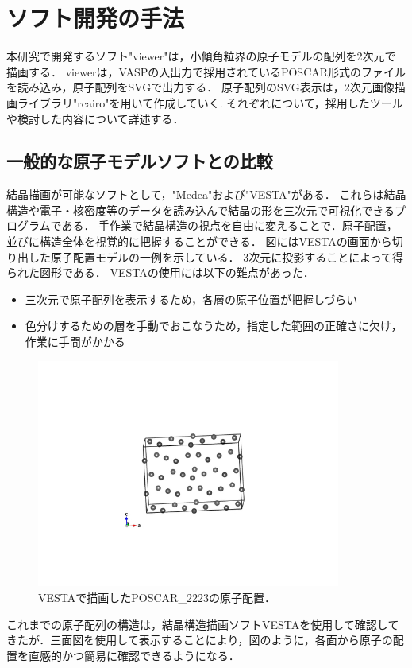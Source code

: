 
\section{ソフト開発の手法}
本研究で開発するソフト"viewer"は，小傾角粒界の原子モデルの配列を2次元で描画する．
viewerは，VASPの入出力で採用されているPOSCAR形式のファイルを読み込み，原子配列をSVGで出力する．
原子配列のSVG表示は，2次元画像描画ライブラリ"rcairo"を用いて作成していく.
それぞれについて，採用したツールや検討した内容について詳述する．

\subsection{一般的な原子モデルソフトとの比較}
結晶描画が可能なソフトとして，"Medea"および"VESTA"がある．
これらは結晶構造や電子・核密度等のデータを読み込んで結晶の形を三次元で可視化できるプログラムである\cite{vesta}．
手作業で結晶構造の視点を自由に変えることで．原子配置，並びに構造全体を視覚的に把握することができる．
図にはVESTAの画面から切り出した原子配置モデルの一例を示している．
3次元に投影することによって得られた図形である．
VESTAの使用には以下の難点があった．

\begin{itemize}
\item 三次元で原子配列を表示するため，各層の原子位置が把握しづらい
\item 色分けするための層を手動でおこなうため，指定した範囲の正確さに欠け，作業に手間がかかる
\end{itemize}
\begin{figure}[htbp]\begin{center}
\includegraphics[width=10cm,bb= 0 0 737 553]{../figs/./boundary_narita.006.jpeg}
\caption{VESTAで描画したPOSCAR\_2223の原子配置．}
\label{default}\end{center}\end{figure}
これまでの原子配列の構造は，結晶構造描画ソフトVESTAを使用して確認してきたが．三面図を使用して表示することにより，図のように，各面から原子の配置を直感的かつ簡易に確認できるようになる．


